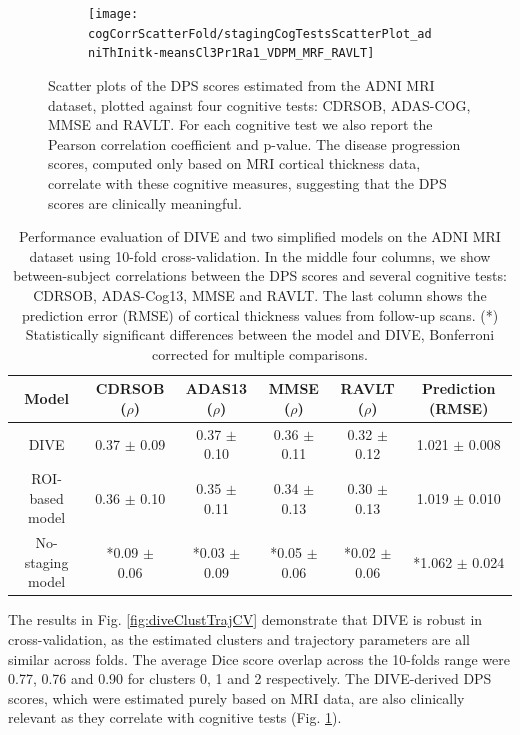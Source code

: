 \begin{figure}[h]
\begin{subfigure}{0.245\textwidth}
    \texttt{[image: \\cogCorrScatterFold/stagingCogTestsScatterPlot\_adniThInitk-meansCl3Pr1Ra1\_VDPM\_MRF\_RAVLT]}
  \end{subfigure}
  \caption[Scatter plot of DIVE-derived DPS scores vs cognitive tests]{Scatter plots of the DPS scores estimated from the ADNI MRI dataset, plotted against four cognitive tests: CDRSOB, ADAS-COG, MMSE and RAVLT. For each cognitive test we also report the Pearson correlation coefficient and p-value. The disease progression scores, computed only based on MRI cortical thickness data, correlate with these cognitive measures, suggesting that the DPS scores are clinically meaningful. }
  \label{fig:diveCogCorr}
\end{figure}



\begin{table}[H]
\centering
\begin{footnotesize}
 \begin{tabular}{c | c c c c | c}
  Model & CDRSOB ($\rho$) & ADAS13 ($\rho$) & MMSE ($\rho$) & RAVLT ($\rho$) & Prediction (RMSE)\\
  \hline 
DIVE & 0.37 $\pm$ 0.09 & 0.37 $\pm$ 0.10 & 0.36 $\pm$ 0.11 & 0.32 $\pm$ 0.12 & 1.021 $\pm$ 0.008 \\
ROI-based model & 0.36 $\pm$ 0.10 & 0.35 $\pm$ 0.11 & 0.34 $\pm$ 0.13 & 0.30 $\pm$ 0.13 & 1.019 $\pm$ 0.010 \\
No-staging model & *0.09 $\pm$ 0.06 & *0.03 $\pm$ 0.09 & *0.05 $\pm$ 0.06 & *0.02 $\pm$ 0.06 & *1.062 $\pm$ 0.024 \\

 \end{tabular}
 \end{footnotesize}
 \caption[Performance evaluation of DIVE and two simplified models on the ADNI MRI dataset]{Performance evaluation of DIVE and two simplified models on the ADNI MRI dataset using 10-fold cross-validation. In the middle four columns, we show between-subject correlations between the DPS scores and several cognitive tests: CDRSOB, ADAS-Cog13, MMSE and RAVLT. The last column shows the prediction error (RMSE) of cortical thickness values from follow-up scans. (*) Statistically significant differences between the model and DIVE, Bonferroni corrected for multiple comparisons.}
 \label{tab:divePerfEval}
\end{table}

The results in Fig. \ref{fig:diveClustTrajCV} demonstrate that DIVE is robust in cross-validation, as the estimated clusters and trajectory parameters are all similar across folds. The average Dice score overlap across the 10-folds range were 0.77, 0.76 and 0.90 for clusters 0, 1 and 2 respectively. The DIVE-derived DPS scores, which were estimated purely based on MRI data, are also clinically relevant as they correlate with cognitive tests (Fig. \ref{fig:diveCogCorr}). 

